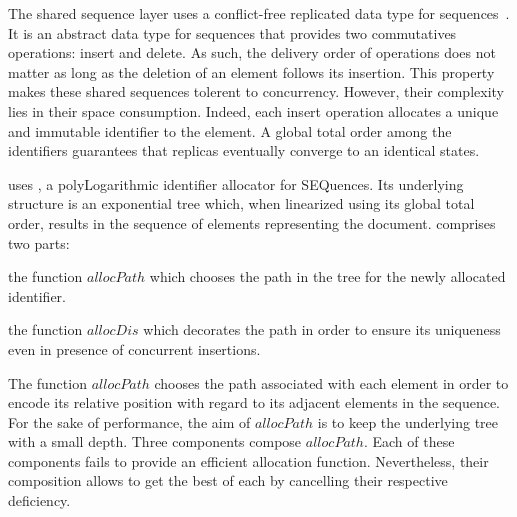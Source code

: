 \begin{asparadesc}
\item [The shared sequence layer] uses a conflict-free replicated data type for
  sequences~\cite{shapiro2011comprehensive, shapiro2011conflict}. It is an
  abstract data type for sequences that provides two commutatives operations:
  insert and delete. As such, the delivery order of operations does not matter
  as long as the deletion of an element follows its insertion. This property
  makes these shared sequences tolerent to concurrency. However, their
  complexity lies in their space consumption. Indeed, each insert operation
  allocates a unique and immutable identifier to the element. A global total
  order among the identifiers guarantees that replicas eventually converge to an
  identical states.

  \CRATE uses \LSEQ, a polyLogarithmic identifier allocator for SEQuences. Its
  underlying structure is an exponential tree which, when linearized using its
  global total order, results in the sequence of elements representing the
  document. \LSEQ comprises two parts:
  \begin{inparaenum}[(i)]
  \item the function $allocPath$ which chooses the path in the tree for the
    newly allocated identifier.
  \item the function $allocDis$ which decorates the path in order to ensure its
    uniqueness even in presence of concurrent insertions.
  \end{inparaenum}

  The function $allocPath$ chooses the path associated with each element in
  order to encode its relative position with regard to its adjacent elements in
  the sequence. For the sake of performance, the aim of $allocPath$ is to keep
  the underlying tree with a small depth. Three components compose
  $allocPath$. Each of these components fails to provide an efficient allocation
  function. Nevertheless, their composition allows to get the best of each by
  cancelling their respective deficiency.
\end{asparadesc}

